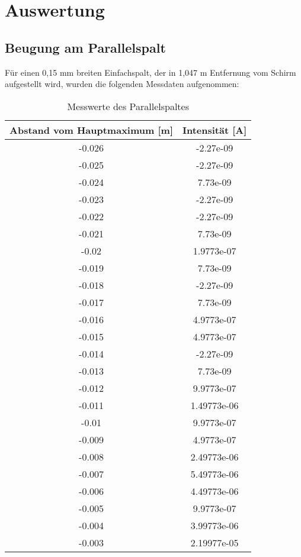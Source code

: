 \section{Auswertung}
\label{sec:Auswertung}

\subsection{Beugung am Parallelspalt}
  Für einen 0,15 mm breiten Einfachspalt, der in 1,047 m Entfernung vom Schirm aufgestellt
  wird, wurden die folgenden Messdaten aufgenommen:
  \begin{table}[H]
  \centering
  \caption{Messwerte des Parallelspaltes}
  \label{tab:mag}
  \begin{tabular}{c c}
   \toprule
    Abstand vom Hauptmaximum [m] & Intensität [A]\\
   \midrule
   -0.026     & -2.27e-09    \\
 -0.025       & -2.27e-09    \\
 -0.024       &  7.73e-09    \\
 -0.023       & -2.27e-09    \\
 -0.022       & -2.27e-09    \\
 -0.021       &  7.73e-09    \\
 -0.02        &  1.9773e-07  \\
 -0.019       &  7.73e-09    \\
 -0.018       & -2.27e-09    \\
 -0.017       &  7.73e-09    \\
 -0.016       &  4.9773e-07  \\
 -0.015       &  4.9773e-07  \\
 -0.014       & -2.27e-09    \\
 -0.013       &  7.73e-09    \\
 -0.012       &  9.9773e-07  \\
 -0.011       &  1.49773e-06 \\
 -0.01        &  9.9773e-07  \\
 -0.009       &  4.9773e-07  \\
 -0.008       &  2.49773e-06 \\
 -0.007       &  5.49773e-06 \\
 -0.006       &  4.49773e-06 \\
 -0.005       &  9.9773e-07  \\
 -0.004       &  3.99773e-06 \\
 -0.003       &  2.19977e-05 \\

\end{tabular}
\end{table}

